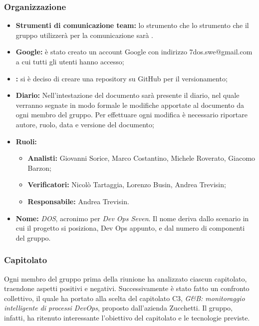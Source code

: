 \subsubsection{Organizzazione}
\begin{itemize}
	\item { \textbf{Strumenti di comunicazione team:} lo strumento che lo strumento che il gruppo utilizzerà per la comunicazione sarà \textit{}.}
	\item{ \textbf{Google:} è stato creato un account Google con indirizzo 7dos.swe@gmail.com a cui tutti gli utenti hanno accesso;}
	\item { \textbf{:} si è deciso di creare una repository su GitHub per il versionamento;}
	\item { \textbf{Diario:} Nell'intestazione del documento sarà presente il diario, nel quale verranno segnate in modo formale le modifiche apportate al documento da ogni membro del gruppo.
		Per effettuare ogni modifica è necessario riportare autore, ruolo, data e versione del documento;}
	\item { \textbf{Ruoli:}  }
	\begin{itemize}
		\item { \textbf{Analisti:} Giovanni Sorice, Marco Costantino, Michele Roverato, Giacomo Barzon;}
		\item { \textbf{Verificatori:} Nicolò Tartaggia, Lorenzo Busin, Andrea Trevisin;}
		\item { \textbf{Responsabile:} Andrea Trevisin.}
	\end{itemize}
	\item { \textbf{Nome:} \emph{DOS}, acronimo per \emph{Dev Ops Seven}. Il nome deriva dallo scenario in cui il progetto si posiziona, Dev Ops appunto, e dal numero di componenti del gruppo.}
\end{itemize}

\subsubsection{Capitolato}
Ogni membro del gruppo prima della riunione ha analizzato ciascun capitolato, traendone aspetti positivi e negativi. Successivamente è stato fatto un confronto collettivo, il quale ha portato alla scelta del capitolato C3, \emph{G\&B: monitoraggio intelligente di processi DevOps}, proposto dall'azienda Zucchetti. Il gruppo, infatti, ha ritenuto interessante l'obiettivo del capitolato e le tecnologie previste.
